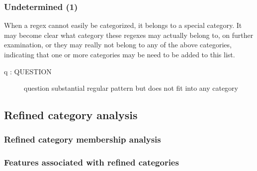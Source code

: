 \subsubsection{Undetermined (1)}
When a regex cannot easily be categorized, it belongs to a special category.  It may become clear what category these regexes may actually belong to, on further examination, or they may really not belong to any of the above categories, indicating that one or more categories may be need to be added to this list.
\begin{description}
\item[ q : QUESTION ] question    substantial regular pattern but does not fit into any category
\end{description}


\subsection{Refined category analysis}

\subsubsection{Refined category membership analysis}
\label{sec:refinedMembership}






\subsubsection{Features associated with refined categories}
\label{sec:categoryFeatures}



